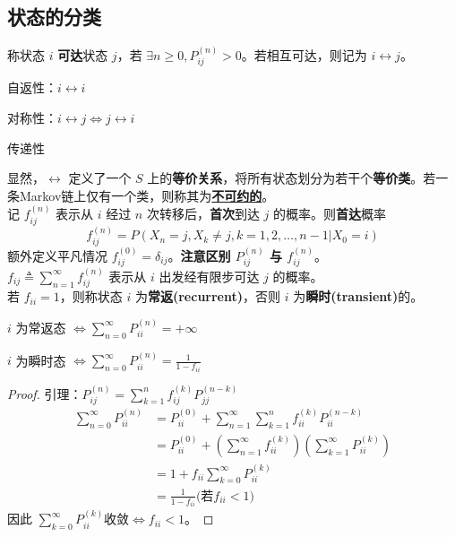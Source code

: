 \documentclass[./main.tex]{subfiles}
\begin{document}
\subsection{状态的分类}
称状态 $i$ \textbf{可达}状态 $j$，若 $\exists n\ge 0,P_{ij}^{(n)}>0$。若相互可达，则记为 $i\leftrightarrow j$。
\begin{enumerate*}
    \item 自返性：$i\leftrightarrow i$
    \item 对称性：$i\leftrightarrow j\iff j\leftrightarrow i$
    \item 传递性
\end{enumerate*}
显然，$\leftrightarrow$ 定义了一个 $S$ 上的\textbf{等价关系}，将所有状态划分为若干个\textbf{等价类}。若一条Markov链上仅有一个类，则称其为\underline{\textbf{不可约的}}。\\
记 $f_{ij}^{(n)}$ 表示从 $i$ 经过 $n$ 次转移后，\textbf{\color{red}首次}到达 $j$ 的概率。则\textbf{首达}概率
\begin{equation*}
    f_{ij}^{(n)}=P(X_n=j,X_k\neq j,k=1,2,\dots,n-1|X_0=i)
\end{equation*}
额外定义平凡情况 $f_{ij}^{(0)}=\delta_{ij}$。\textbf{\color{red}注意区别 $P_{ij}^{(n)}$ 与 $f_{ij}^{(n)}$}。\\
$f_{ij}\triangleq\sum_{n=1}^{\infty}f_{ij}^{(n)}$ 表示从 $i$ 出发经有限步可达 $j$ 的概率。\\
若 $f_{ii}=1$，则称状态 $i$ 为\textbf{常返(recurrent)}，否则 $i$ 为\textbf{瞬时(transient)}的。\\
\vspace{-0.7em}
\begin{itemize*}
    \item $i$ 为常返态 $\iff \sum_{n=0}^{\infty}P_{ii}^{(n)}=+\infty$
    \item $i$ 为瞬时态 $\iff\sum_{n=0}^{\infty}P_{ii}^{(n)}=\frac{1}{1-f_{ii}}$
\end{itemize*}
\begin{proof}
    引理：$P_{ij}^{(n)}=\sum_{k=1}^{n}f_{ij}^{(k)}P_{jj}^{(n-k)
}$
\begin{align*}
    \sum_{n=0}^{\infty}P_{ii}^{(n)}&=P_{ii}^{(0)}+\sum_{n=1}^{\infty}\sum_{k=1}^{n}f_{ii}^{(k)}P_{ii}^{(n-k)}\\
    &=P_{ii}^{(0)}+\left(\sum_{n=1}^{\infty}f_{ii}^{(k)}\right) \left(\sum_{k=1}^{\infty}P_{ii}^{(k)}\right)\\
    &=1+f_{ii}\sum_{k=0}^{\infty}P_{ii}^{(k)}\\
    &=\frac{1}{1-f_{ii}}\text{(若$f_{ii}<1$)}
\end{align*}
因此 $\sum_{k=0}^{\infty}P_{ii}^{(k)}\text{收敛}\iff f_{ii}<1$。
\end{proof}
\end{document}
